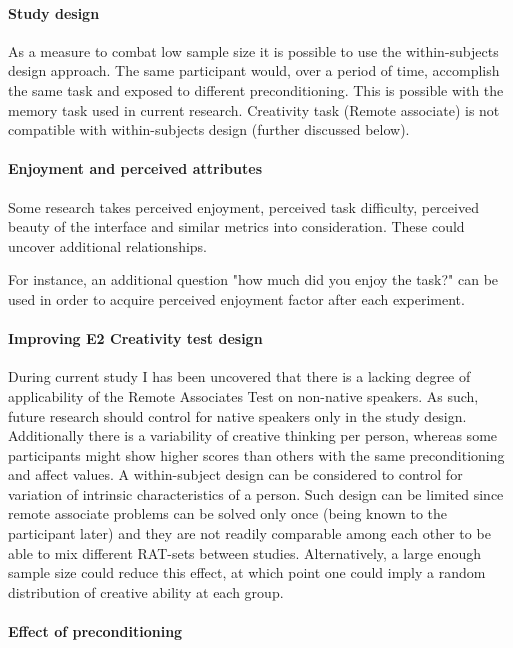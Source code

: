 \paragraph{Study design} As a measure to combat low sample size it is possible to use the within-subjects design approach. The same participant would, over a period of time, accomplish the same task and exposed to different preconditioning. This is possible with the memory task used in current research. Creativity task (Remote associate) is not compatible with within-subjects design (further discussed below).

\paragraph{Enjoyment and perceived attributes}
Some research takes perceived enjoyment, perceived task difficulty, perceived beauty of the interface and similar metrics into consideration. These could uncover additional relationships.

For instance, an additional question "how much did you enjoy the task?" can be used in order to acquire perceived enjoyment factor after each experiment.

\paragraph{Improving E2 Creativity test design}
During current study I has been uncovered that there is a lacking degree of applicability of the Remote Associates Test on non-native speakers. As such, future research should control for native speakers only in the study design. Additionally there is a variability of creative thinking per person, whereas some participants might show higher scores than others with the same preconditioning and affect values. A within-subject design can be considered to control for variation of intrinsic characteristics of a person. Such design can be limited since remote associate problems can be solved only once (being known to the participant later) and they are not readily comparable among each other to be able to mix different RAT-sets between studies. Alternatively, a large enough sample size could reduce this effect, at which point one could imply a random distribution of creative ability at each group.

\paragraph{Effect of preconditioning}

